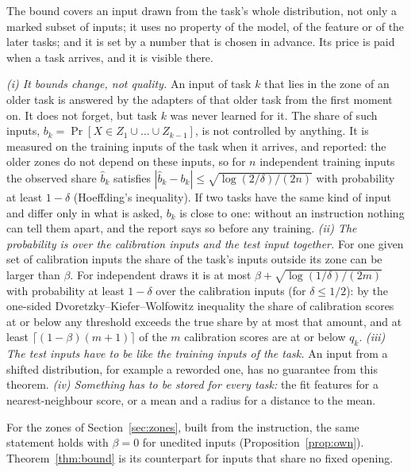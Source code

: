 The bound covers an input drawn from the task's whole distribution, not only a marked subset of inputs; it uses no property of
the model, of the feature or of the later tasks; and it is set by a number that is chosen in
advance. Its price is paid when a task arrives, and it is visible there.

\begin{remark}
\label{rem:boundlimits}
\emph{(i) It bounds change, not quality.} An input of task $k$ that lies in the zone of an older
task is answered by the adapters of that older task from the first moment on. It does not forget,
but task $k$ was never learned for it. The share of such inputs,
$b_k = \Pr[X \in Z_1 \cup \dots \cup Z_{k-1}]$, is not controlled by anything. It is measured on the
training inputs of the task when it arrives, and reported: the older zones do not depend on these
inputs, so for $n$ independent training inputs the observed share $\hat b_k$ satisfies
$|\hat b_k - b_k| \le \sqrt{\log(2/\delta)/(2n)}$ with probability at least $1 - \delta$
(Hoeffding's inequality). If two tasks have the same kind of input and differ only in what is asked,
$b_k$ is close to one: without an instruction nothing can tell them apart, and the report says so
before any training.
\emph{(ii) The probability is over the calibration inputs and the test input together.} For one
given set of calibration inputs the share of the task's inputs outside its zone can be larger than
$\beta$. For independent draws it is at most $\beta + \sqrt{\log(1/\delta)/(2m)}$ with probability
at least $1 - \delta$ over the calibration inputs (for $\delta \le 1/2$): by the one-sided
Dvoretzky--Kiefer--Wolfowitz inequality
the share of calibration scores at or below any threshold exceeds the true share by at most that
amount, and at least $\lceil (1-\beta)(m+1) \rceil$ of the $m$ calibration scores are at or below
$q_k$.
\emph{(iii) The test inputs have to be like the training inputs of the task.} An input from a
shifted distribution, for example a reworded one, has no guarantee from this theorem.
\emph{(iv) Something has to be stored for every task:} the fit features for a nearest-neighbour
score, or a mean and a radius for a distance to the mean.
\end{remark}

For the zones of Section~\ref{sec:zones}, built from the instruction, the same statement holds with
$\beta = 0$ for unedited inputs (Proposition~\ref{prop:own}). Theorem~\ref{thm:bound} is its
counterpart for inputs that share no fixed opening.
